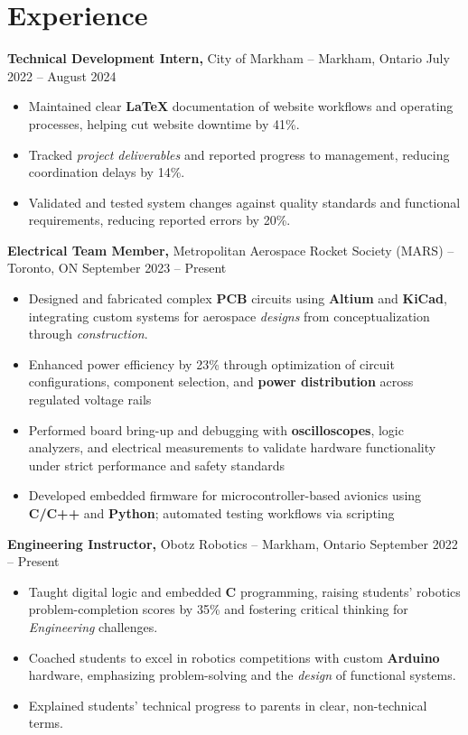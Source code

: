 \documentclass[11pt]{article}
\begin{document}
\section*{Experience}

\smallskip
\textbf{Technical Development Intern,} {City of Markham} -- Markham, Ontario \hfill July 2022 -- August 2024 \\
\begin{itemize}
  \item Maintained clear \textbf{LaTeX} documentation of website workflows and operating processes, helping cut website downtime by 41\%.
  \item Tracked \textit{project deliverables} and reported progress to management, reducing coordination delays by 14\%.
  \item Validated and tested system changes against quality standards and functional requirements, reducing reported errors by 20\%.
\end{itemize}

\smallskip
\textbf{Electrical Team Member,} {Metropolitan Aerospace Rocket Society (MARS)} -- Toronto, ON \hfill September 2023 -- Present \\
\vspace{-9pt}
\begin{itemize}
  \item Designed and fabricated complex \textbf{PCB} circuits using \textbf{Altium} and \textbf{KiCad}, integrating custom systems for aerospace \textit{designs} from conceptualization through \textit{construction}.
  \item Enhanced power efficiency by 23\% through optimization of circuit configurations, component selection, and \textbf{power distribution} across regulated voltage rails
  \item Performed board bring-up and debugging with \textbf{oscilloscopes}, logic analyzers, and electrical measurements to validate hardware functionality under strict performance and safety standards
  \item Developed embedded firmware for microcontroller-based avionics using \textbf{C/C++} and \textbf{Python}; automated testing workflows via scripting
\end{itemize}

\smallskip
\textbf{Engineering Instructor,} {Obotz Robotics} -- Markham, Ontario \hfill September 2022 -- Present \\
\begin{itemize}
  \item Taught digital logic and embedded \textbf{C} programming, raising students' robotics problem-completion scores by 35\% and fostering critical thinking for \textit{Engineering} challenges.
  \item Coached students to excel in robotics competitions with custom \textbf{Arduino} hardware, emphasizing problem-solving and the \textit{design} of functional systems.
  \item Explained students' technical progress to parents in clear, non-technical terms.
\end{itemize}
\end{document}
